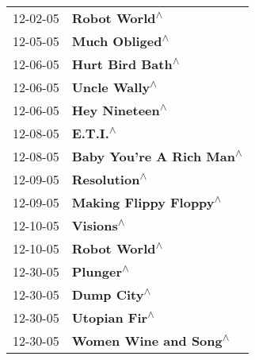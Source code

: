 \begin{supertabular}{p{0.25\columnwidth}p{0.75\columnwidth}}
 12-02-05 &                                                              \textbf{Robot World\textsuperscript{$\wedge$}} \\
 12-05-05 &                                                             \textbf{Much Obliged\textsuperscript{$\wedge$}} \\
 12-06-05 &                                                           \textbf{Hurt Bird Bath\textsuperscript{$\wedge$}} \\
 12-06-05 &                                                              \textbf{Uncle Wally\textsuperscript{$\wedge$}} \\
 12-06-05 &                                                             \textbf{Hey Nineteen\textsuperscript{$\wedge$}} \\
 12-08-05 &                                                                   \textbf{E.T.I.\textsuperscript{$\wedge$}} \\
 12-08-05 &                                                   \textbf{Baby You're A Rich Man\textsuperscript{$\wedge$}} \\
 12-09-05 &                                                               \textbf{Resolution\textsuperscript{$\wedge$}} \\
 12-09-05 &                                                     \textbf{Making Flippy Floppy\textsuperscript{$\wedge$}} \\
 12-10-05 &                                                                  \textbf{Visions\textsuperscript{$\wedge$}} \\
 12-10-05 &                                                              \textbf{Robot World\textsuperscript{$\wedge$}} \\
 12-30-05 &                                                                  \textbf{Plunger\textsuperscript{$\wedge$}} \\
 12-30-05 &                                                                \textbf{Dump City\textsuperscript{$\wedge$}} \\
 12-30-05 &                                                              \textbf{Utopian Fir\textsuperscript{$\wedge$}} \\
 12-30-05 &                                                      \textbf{Women Wine and Song\textsuperscript{$\wedge$}} \\
\end{supertabular}
